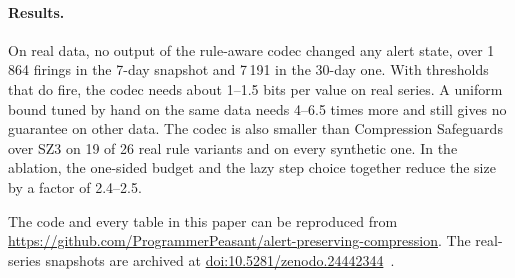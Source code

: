 \paragraph{Results.} On real data, no output of the rule-aware codec
changed any alert state, over 1\,864 firings in the 7-day snapshot and
7\,191 in the 30-day one. With thresholds that do fire, the codec needs
about 1--1.5 bits per value on real series. A uniform bound tuned by hand
on the same data needs 4--6.5 times more and still gives no guarantee on
other data. The codec is also smaller than Compression Safeguards over SZ3
on 19 of 26 real rule variants and on every synthetic one. In the
ablation, the one-sided budget and the lazy step choice together reduce
the size by a factor of 2.4--2.5.

The code and every table in this paper can be reproduced from
\url{https://github.com/ProgrammerPeasant/alert-preserving-compression}.
The real-series snapshots are archived at
\href{https://doi.org/10.5281/zenodo.24442344}{doi:10.5281/zenodo.24442344}~\cite{serykh2026snapshots}.
